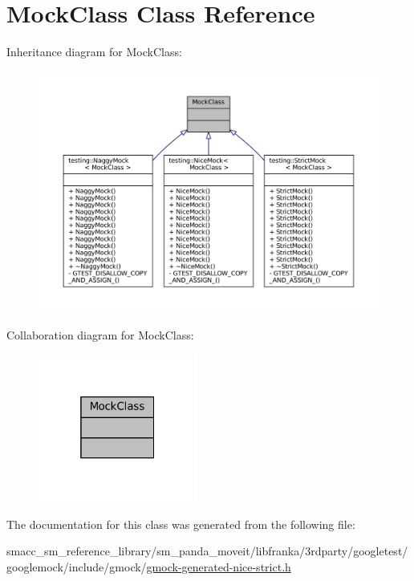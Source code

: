 \hypertarget{classMockClass}{}\section{Mock\+Class Class Reference}
\label{classMockClass}


Inheritance diagram for Mock\+Class\+:
\nopagebreak
\begin{figure}[H]
\begin{center}
\leavevmode
\includegraphics[width=350pt]{classMockClass__inherit__graph}
\end{center}
\end{figure}


Collaboration diagram for Mock\+Class\+:
\nopagebreak
\begin{figure}[H]
\begin{center}
\leavevmode
\includegraphics[width=148pt]{classMockClass__coll__graph}
\end{center}
\end{figure}


The documentation for this class was generated from the following file\+:\begin{DoxyCompactItemize}
\item 
smacc\+\_\+sm\+\_\+reference\+\_\+library/sm\+\_\+panda\+\_\+moveit/libfranka/3rdparty/googletest/googlemock/include/gmock/\hyperlink{gmock-generated-nice-strict_8h}{gmock-\/generated-\/nice-\/strict.\+h}\end{DoxyCompactItemize}
